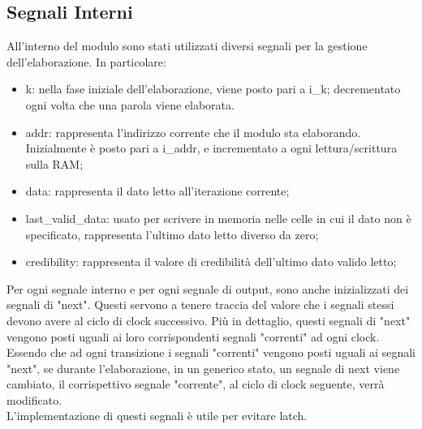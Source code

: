\documentclass{article}
\begin{document}
\subsection{Segnali Interni}
All'interno del modulo sono stati utilizzati diversi segnali per la gestione\\dell'elaborazione.
In particolare:
\begin{itemize}
    \item k: nella fase iniziale dell'elaborazione, viene posto pari a i\_k; decrementato ogni volta che una parola viene elaborata.
    \item addr: rappresenta l'indirizzo corrente che il modulo sta elaborando. Inizialmente è posto pari a i\_addr, e incrementato a ogni lettura/scrittura sulla RAM;
    \item data: rappresenta il dato letto all'iterazione corrente;
    \item last\_valid\_data: usato per scrivere in memoria nelle celle in cui il dato non è specificato, rappresenta l'ultimo dato letto diverso da zero;
    \item credibility: rappresenta il valore di credibilità dell'ultimo dato valido letto;
\end{itemize}
Per ogni segnale interno e per ogni segnale di output, sono anche inizializzati dei segnali di "next". Questi servono a tenere traccia del valore che i segnali stessi devono avere al ciclo di clock successivo.
Più in dettaglio, questi segnali di "next" vengono posti uguali ai loro corrispondenti segnali "correnti" ad ogni clock. Essendo che ad ogni transizione i segnali "correnti" vengono posti uguali ai segnali "next", se durante l'elaborazione, in un generico stato, un segnale di next viene cambiato, il corrispettivo segnale "corrente", al ciclo di clock seguente, verrà modificato.\\
L'implementazione di questi segnali è utile per evitare latch.
\end{document}
